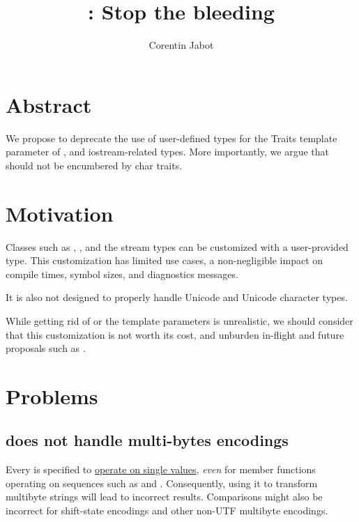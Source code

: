 \documentclass{wg21}
\title{\tcode{char\_traits}: Stop the bleeding}
\author{Corentin Jabot}{corentin.jabot@gmail.com}
\begin{document}
\maketitle

\section{Abstract}

We propose to deprecate the use of user-defined types for the Traits template parameter of ,  
and iostream-related types. More importantly, we argue that  should not be encumbered by char traits.


\section{Motivation}

Classes such as , , and the stream types can be customized with a user-provided  type.
This customization has limited use cases, a non-negligible impact on compile times, symbol sizes, and diagnostics messages.

It is also not designed to properly handle Unicode and Unicode character types.

While getting rid of  or the  template parameters is unrealistic, we should consider that this customization
is not worth its cost, and unburden in-flight and future proposals such as  .

\section{Problems}

\subsection{ does not handle multi-bytes encodings}

Every   is specified to \href{https://eel.is/c++draft/strings#tab:char.traits.req}{operate on single values}, \emph{even} for member functions operating on
sequences such as  and .
Consequently, using it to transform multibyte strings will lead to incorrect results.
Comparisons might also be incorrect for shift-state encodings and other non-UTF multibyte encodings.
\end{document}
